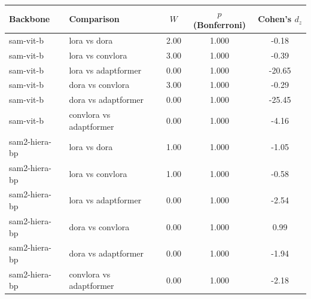\begin{tabular}{llccc}
\toprule
Backbone & Comparison & $W$ & $p$ (Bonferroni) & Cohen's $d_z$ \\
\midrule
sam-vit-b & lora vs dora & 2.00 & 1.000 & -0.18 \\
sam-vit-b & lora vs convlora & 3.00 & 1.000 & -0.39 \\
sam-vit-b & lora vs adaptformer & 0.00 & 1.000 & -20.65 \\
sam-vit-b & dora vs convlora & 3.00 & 1.000 & -0.29 \\
sam-vit-b & dora vs adaptformer & 0.00 & 1.000 & -25.45 \\
sam-vit-b & convlora vs adaptformer & 0.00 & 1.000 & -4.16 \\
sam2-hiera-bp & lora vs dora & 1.00 & 1.000 & -1.05 \\
sam2-hiera-bp & lora vs convlora & 1.00 & 1.000 & -0.58 \\
sam2-hiera-bp & lora vs adaptformer & 0.00 & 1.000 & -2.54 \\
sam2-hiera-bp & dora vs convlora & 0.00 & 1.000 & 0.99 \\
sam2-hiera-bp & dora vs adaptformer & 0.00 & 1.000 & -1.94 \\
sam2-hiera-bp & convlora vs adaptformer & 0.00 & 1.000 & -2.18 \\
\bottomrule
\end{tabular}

